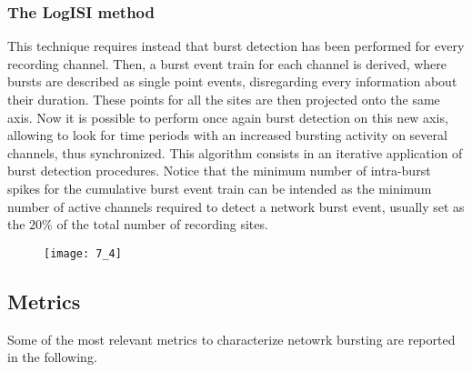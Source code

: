 \subsubsection{The LogISI method}
This technique requires instead that burst detection has been performed for every
recording channel. Then, a burst event train for each channel is derived, where
bursts are described as single point events, disregarding every information about
their duration. These points for all the sites are then projected onto the same axis.
Now it is possible to perform once again burst detection on this new axis, allowing
to look for time periods with an increased bursting activity on several channels, thus
synchronized. This algorithm consists in an iterative application of burst detection
procedures. Notice that the minimum number of intra-burst spikes for the cumulative
burst event train can be intended as the minimum number of active channels required
to detect a network burst event, usually set as the \(20\%\) of the total number of
recording sites.
\begin{figure}[H]
    \texttt{[image: 7\_4]}
    \centering
\end{figure}

\subsection{Metrics}
Some of the most relevant metrics to characterize netowrk bursting are reported
in the following.
